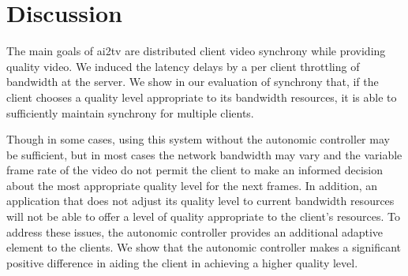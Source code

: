 \documentclass{sig-alternate}
\begin{document}


\section{Discussion} \label{discussion}

The main goals of ai2tv are distributed client video synchrony while
providing quality video.  We induced the latency delays by a per
client throttling of bandwidth at the server.  We show in our
evaluation of synchrony that, if the client chooses a quality level
appropriate to its bandwidth resources, it is able to sufficiently
maintain synchrony for multiple clients.

Though in some cases, using this system without the autonomic
controller may be sufficient, but in most cases the network bandwidth
may vary and the variable frame rate of the video do not permit the
client to make an informed decision about the most appropriate quality
level for the next frames.  In addition, an application that does not
adjust its quality level to current bandwidth resources will not be
able to offer a level of quality appropriate to the client's
resources.  To address these issues, the autonomic controller provides
an additional adaptive element to the clients.  We show that the
autonomic controller makes a significant positive difference in aiding
the client in achieving a higher quality level.
\end{document}
